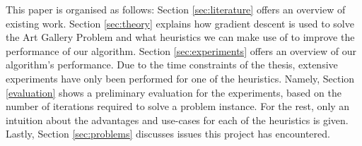 This paper is organised as follows: Section \ref{sec:literature} offers an overview of existing work. Section \ref{sec:theory} explains how gradient descent is used to solve the Art Gallery Problem and what heuristics we can make use of to improve the performance of our algorithm. Section \ref{sec:experiments} offers an overview of our algorithm's performance. Due to the time constraints of the thesis, extensive experiments have only been performed for one of the heuristics. Namely, Section \ref{evaluation} shows a preliminary evaluation for the experiments, based on the number of iterations required to solve a problem instance. For the rest, only an intuition about the advantages and use-cases for each of the heuristics is given. 
Lastly, Section \ref{sec:problems} discusses issues this project has encountered.
